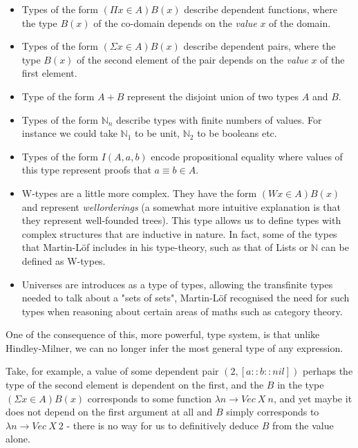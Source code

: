 \documentclass{ProgressReport}[2020/09/15]
\begin{document}
          \begin{itemize}
          \item Types of the form $( \Pi x \in A ) B(x)$ describe
            dependent functions, where the type $B(x)$ of the co-domain
            depends on the \emph{value} $x$ of the domain.
          \item Types of the form $( \Sigma x \in A ) B(x)$ describe
            dependent pairs, where the type $B(x)$ of the second
            element of the pair depends on the \emph{value} $x$ of the
            first element.
          \item Type of the form $A + B$ represent the disjoint union
            of two types $A$ and $B$.
          \item Types of the form $\mathbb{N}_n$ describe types
            with finite numbers of values. For instance we could take
            $\mathbb{N}_1$ to be unit, $\mathbb{N}_2$ to be booleans
            etc.
          \item Types of the form $I (A , a , b)$ encode propositional
            equality where values of this type represent proofs
            that $a \equiv b \in A$.
          \item W-types are a little more complex. They have the form
            $( W x \in A ) B(x)$ and represent \emph{wellorderings} (a
            somewhat more intuitive explanation is that they represent
            well-founded trees). This type allows us to define types
            with complex structures that are inductive in nature. In fact,
            some of the types that Martin-Löf includes in his
            type-theory, such as that of Lists or $\mathbb{N}$ can be
            defined as W-types.
          \item Universes are introduces as a type of types, allowing
            the transfinite types needed to talk about a "sets of
            sets", Martin-Löf recognised the need for such types when
            reasoning about certain areas of maths such as category
            theory.
          \end{itemize}

          One of the consequence of this, more powerful, type system,
          is that unlike Hindley-Milner, we can no longer infer the
          most general type of any expression.

          Take, for example, a value of some dependent pair $(2 , [a :: b
            :: nil])$ perhaps the type of the second element is
          dependent on the first, and the $B$ in the type $(
          \Sigma x \in A ) B(x)$ corresponds to some function $\lambda
          n \to Vec \: X \: n$, and yet maybe it does not depend on the first
          argument at all and $B$ simply corresponds to $\lambda n \to
          Vec \: X \: 2$ - there is no way for us to definitively
          deduce $B$ from the value alone.
  
\end{document}

